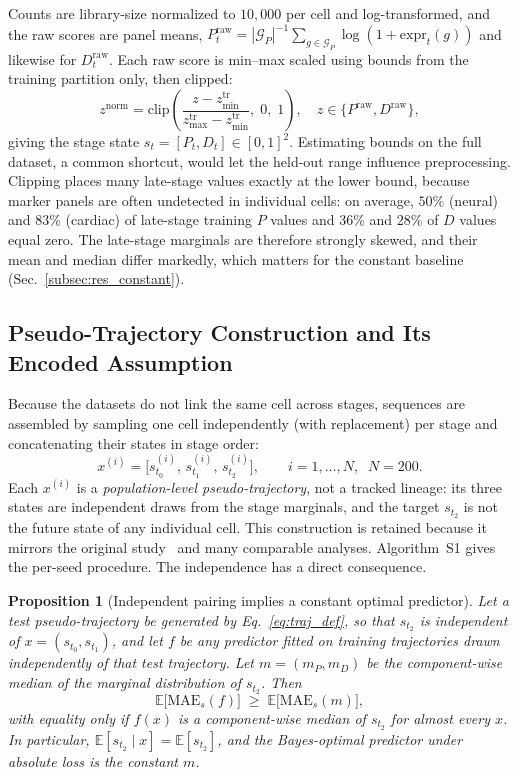 \documentclass[10pt,journal,compsoc]{IEEEtran}
\newtheorem{proposition}{Proposition}
\begin{document}
Counts are library-size normalized to $10{,}000$ per cell and log-transformed, and the raw scores are panel means, $P^{\mathrm{raw}}_t=|\mathcal{G}_P|^{-1}\sum_{g\in\mathcal{G}_P}\log(1+\mathrm{expr}_t(g))$ and likewise for $D^{\mathrm{raw}}_t$. Each raw score is min--max scaled using bounds from the training partition only, then clipped:
\begin{equation}
z^{\mathrm{norm}} = \mathrm{clip}\!\left(\frac{z - z_{\min}^{\mathrm{tr}}}{z_{\max}^{\mathrm{tr}} - z_{\min}^{\mathrm{tr}}},\;0,\;1\right), \quad z\in\{P^{\mathrm{raw}},D^{\mathrm{raw}}\},
\label{eq:minmax_clip}
\end{equation}
giving the stage state $s_t=[P_t,D_t]\in[0,1]^2$. Estimating bounds on the full dataset, a common shortcut, would let the held-out range influence preprocessing. Clipping places many late-stage values exactly at the lower bound, because marker panels are often undetected in individual cells: on average, $50\%$ (neural) and $83\%$ (cardiac) of late-stage training $P$ values and $36\%$ and $28\%$ of $D$ values equal zero. The late-stage marginals are therefore strongly skewed, and their mean and median differ markedly, which matters for the constant baseline (Sec.~\ref{subsec:res_constant}).

\subsection{Pseudo-Trajectory Construction and Its Encoded Assumption}
\label{subsec:traj}

Because the datasets do not link the same cell across stages, sequences are assembled by sampling one cell independently (with replacement) per stage and concatenating their states in stage order:
\begin{equation}
x^{(i)}=\big[s_{t_0}^{(i)},\,s_{t_1}^{(i)},\,s_{t_2}^{(i)}\big],
\qquad i=1,\dots,N,\;\; N=200.
\label{eq:traj_def}
\end{equation}
Each $x^{(i)}$ is a \emph{population-level pseudo-trajectory}, not a tracked lineage: its three states are independent draws from the stage marginals, and the target $s_{t_2}$ is not the future state of any individual cell. This construction is retained because it mirrors the original study~\cite{kanu2026transformer} and many comparable analyses. Algorithm~S1 gives the per-seed procedure. The independence has a direct consequence.

\begin{proposition}[Independent pairing implies a constant optimal predictor]
\label{prop:null}
Let a test pseudo-trajectory be generated by Eq.~\eqref{eq:traj_def}, so that $s_{t_2}$ is independent of $x=(s_{t_0},s_{t_1})$, and let $f$ be any predictor fitted on training trajectories drawn independently of that test trajectory. Let $m=(m_P,m_D)$ be the component-wise median of the marginal distribution of $s_{t_2}$. Then
\[
\mathbb{E}\big[\mathrm{MAE}_s(f)\big]\;\ge\;\mathbb{E}\big[\mathrm{MAE}_s(m)\big],
\]
with equality only if $f(x)$ is a component-wise median of $s_{t_2}$ for almost every $x$. In particular, $\mathbb{E}[s_{t_2}\mid x]=\mathbb{E}[s_{t_2}]$, and the Bayes-optimal predictor under absolute loss is the constant $m$.
\end{proposition}
\end{document}
